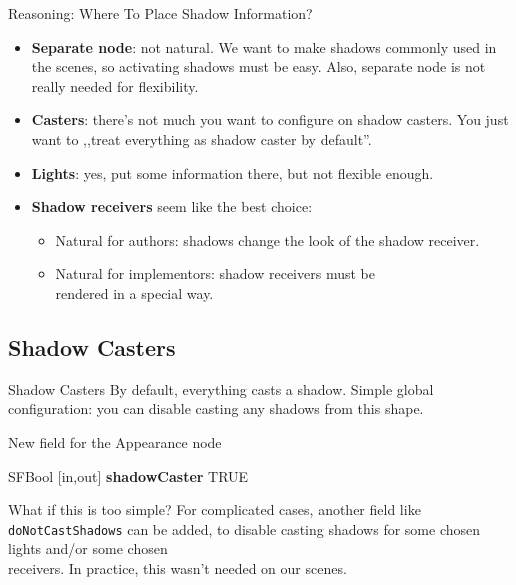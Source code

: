 \documentclass{beamer}
\newcommand*{\codeem}[1]{\textbf{#1}}
\begin{document}
\begin{frame}{Reasoning: Where To Place Shadow Information?}
  \begin{itemize}
    \item \textbf{Separate node}: not natural. We want to make shadows
      commonly used in the scenes, so activating shadows must be easy.
      Also, separate node is not really needed for flexibility.
    \item \textbf{Casters}:
      there's not much you want to configure on shadow casters.
      You just want to ,,treat everything as shadow caster by default''.
    \item \textbf{Lights}: yes, put some information there, but not flexible enough.
    \item \textbf{Shadow receivers} seem like the best choice:
      \begin{itemize}
        \item Natural for authors: shadows change the look of the shadow receiver.
        \item Natural for implementors: shadow receivers must be\\
          rendered in a special way.
      \end{itemize}
  \end{itemize}
\end{frame}

\subsection{Shadow Casters}

\begin{frame}[fragile]{Shadow Casters}
  By default, everything casts a shadow.
  Simple global configuration: you can disable casting any shadows
  from this shape.

\begin{block}{New field for the Appearance node}
\begin{semiverbatim}
SFBool  [in,out]  \codeem{shadowCaster}  TRUE
\end{semiverbatim}
\end{block}

  \alert{What if this is too simple?} For complicated cases,
  another field like \texttt{doNotCastShadows} can be added,
  to disable casting shadows for some chosen lights and/or some
  chosen\\ receivers. \alert{In practice, this wasn't needed on our scenes.}
\end{frame}
\end{document}
